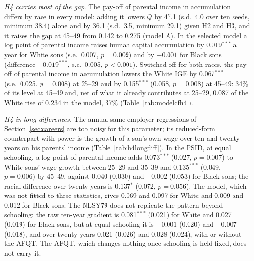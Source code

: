 

\textit{H4 carries most of the gap.} The pay-off of parental income in accumulation differs by race in every model: adding
it lowers $Q$ by 47.1 (s.d.\ 4.0 over ten seeds, minimum 38.4) alone and by 36.1 (s.d.\ 3.5, minimum 29.1) given H2
and H3, and it raises the gap at 45--49 from 0.142 to 0.275 (model A). In the selected model a log point of parental
income raises human capital accumulation by 0.019$^{***}$ a year for White sons (s.e.\ 0.007, $p = 0.009$) and by
$-0.001$ for Black sons (difference $-0.019^{***}$, s.e.\ 0.005, $p < 0.001$). Switched off for both races, the
pay-off of parental income in accumulation lowers the White IGE by 0.067$^{***}$ (s.e.\ 0.025, $p = 0.008$) at 25--29
and by 0.155$^{***}$ (0.058, $p = 0.008$) at 45--49: 34\% of its level at 45--49 and, net of what it already
contributes at 25--29, 0.087 of the White rise of 0.234 in the model, 37\% (Table~\ref{tab:modelcfh4}).



\textit{H4 in long differences.} The annual same-employer regressions of Section~\ref{sec:careers} are too noisy for
this parameter; its reduced-form counterpart with power is the growth of a son's own wage over ten and twenty years on
his parents' income (Table~\ref{tab:h4longdiff}). In the PSID, at equal schooling, a log point of parental income adds
0.073$^{***}$ (0.027, $p = 0.007$) to White sons' wage growth between 25--29 and 35--39 and 0.135$^{***}$ (0.049,
$p = 0.006$) by 45--49, against 0.040 (0.030) and $-0.002$ (0.053) for Black sons; the racial difference over twenty
years is 0.137$^{*}$ (0.072, $p = 0.056$). The model, which was not fitted to these statistics, gives 0.069 and 0.097 for
White and 0.009 and 0.012 for Black sons. The NLSY79 does not replicate the pattern beyond schooling: the raw ten-year
gradient is 0.081$^{***}$ (0.021) for White and 0.027 (0.019) for Black sons, but at equal schooling it is $-0.001$
(0.020) and $-0.007$ (0.018), and over twenty years 0.021 (0.026) and 0.028 (0.024), with or without the AFQT. The AFQT, which changes nothing once schooling is held fixed, does not carry it.



